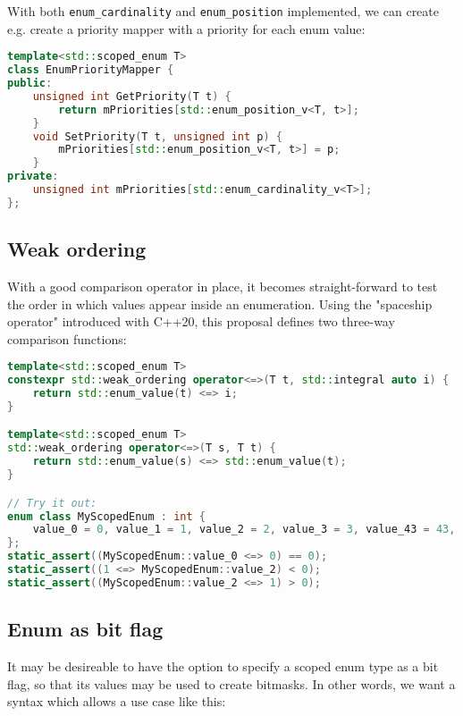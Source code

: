 \documentclass[
  format=manuscript,
  screen=true,
  review=false,
  nonacm=true,
  timestamp=true,
  balance=false]{acmart}
\begin{document}
\noindent
With both \texttt{enum\_cardinality} and \texttt{enum\_position} implemented, we
can create e.g. create a priority mapper with a priority for each enum value:\vspace{2mm}

\begin{lstlisting}[language=Cpp]
template<std::scoped_enum T>
class EnumPriorityMapper {
public:
    unsigned int GetPriority(T t) {
        return mPriorities[std::enum_position_v<T, t>];
    }
    void SetPriority(T t, unsigned int p) {
        mPriorities[std::enum_position_v<T, t>] = p;
    }
private:
    unsigned int mPriorities[std::enum_cardinality_v<T>];
};
\end{lstlisting}


\subsection{Weak ordering}

With a good comparison operator in place, it becomes straight-forward to test
the order in which values appear inside an enumeration. Using the "spaceship operator"
introduced with C++20, this proposal defines two three-way comparison functions:\vspace{2mm}

\begin{lstlisting}[language=Cpp]
template<std::scoped_enum T>
constexpr std::weak_ordering operator<=>(T t, std::integral auto i) {
    return std::enum_value(t) <=> i;
}

template<std::scoped_enum T>
std::weak_ordering operator<=>(T s, T t) {
    return std::enum_value(s) <=> std::enum_value(t);
}

// Try it out:
enum class MyScopedEnum : int {
    value_0 = 0, value_1 = 1, value_2 = 2, value_3 = 3, value_43 = 43, value_57 = 57
};
static_assert((MyScopedEnum::value_0 <=> 0) == 0);
static_assert((1 <=> MyScopedEnum::value_2) < 0);
static_assert((MyScopedEnum::value_2 <=> 1) > 0);
\end{lstlisting}


\subsection{Enum as bit flag}

It may be desireable to have the option to specify a scoped enum type as a bit flag,
so that its values may be used to create bitmasks. In other words, we want a syntax
which allows a use case like this:\vspace{2mm}
\end{document}
